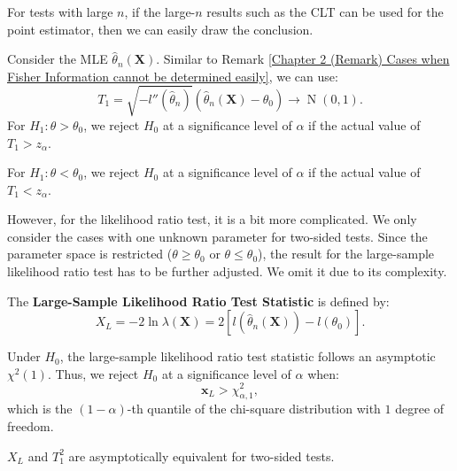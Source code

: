 \documentclass{huhtakm-template-book-v2}
\DeclareMathOperator{\N}{N}
\begin{document}
    For tests with large $n$, if the large-$n$ results such as the CLT can be used for the point estimator, then we can easily draw the conclusion.
    \begin{eg}
        Consider the MLE $\hat{\theta}_{n}(\mathbf{X})$. Similar to Remark \ref{Chapter 2 (Remark) Cases when Fisher Information cannot be determined easily}, we can use:
        \begin{equation*}
            T_{1}=\sqrt{-l''(\hat{\theta}_{n})}(\hat{\theta}_{n}(\mathbf{X})-\theta_{0})\to\N(0,1).
        \end{equation*}
        For $H_{1}:\theta>\theta_{0}$, we reject $H_{0}$ at a significance level of $\alpha$ if the actual value of $T_{1}>z_{\alpha}$.
        
        For $H_{1}:\theta<\theta_{0}$, we reject $H_{0}$ at a significance level of $\alpha$ if the actual value of $T_{1}<z_{\alpha}$.
    \end{eg}
    However, for the likelihood ratio test, it is a bit more complicated. We only consider the cases with one unknown parameter for two-sided tests. Since the parameter space is restricted ($\theta\geq\theta_{0}$ or $\theta\leq\theta_{0}$), the result for the large-sample likelihood ratio test has to be further adjusted. We omit it due to its complexity.
    \begin{defn}
        The \textbf{Large-Sample Likelihood Ratio Test Statistic} is defined by:
        \begin{equation*}
            X_{L}=-2\ln{\lambda(\mathbf{X})}=2\left[l\left(\hat{\theta}_{n}(\mathbf{X})\right)-l(\theta_{0})\right].
        \end{equation*}
    \end{defn}
    \begin{thm}
        Under $H_{0}$, the large-sample likelihood ratio test statistic follows an asymptotic $\chi^{2}(1)$. Thus, we reject $H_{0}$ at a significance level of $\alpha$ when:
        \begin{equation*}
            \mathbf{x}_{L}>\chi_{\alpha,1}^{2},
        \end{equation*}
        which is the $(1-\alpha)$-th quantile of the chi-square distribution with $1$ degree of freedom.
    \end{thm}
    \begin{rem}
        $X_{L}$ and $T_{1}^{2}$ are asymptotically equivalent for two-sided tests.
    \end{rem}
\end{document}
